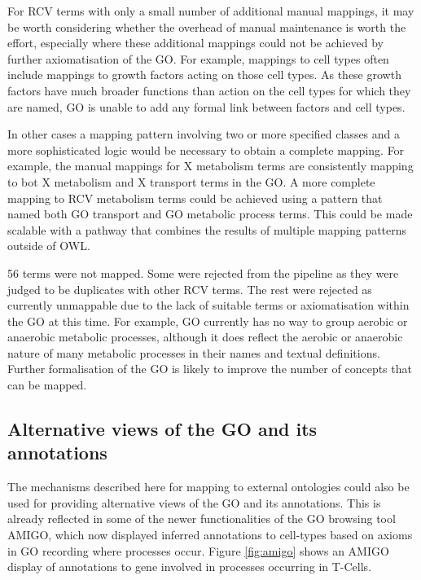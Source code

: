 \documentclass[runningheads,a4paper]{llncs}
\begin{document}
{{For RCV terms with only a small number of additional manual mappings, it may be worth considering whether the overhead of manual maintenance is worth the effort, especially where these additional mappings could not be achieved by further axiomatisation of the \ac{GO}.  For example, mappings to cell types often include mappings to growth factors acting on those cell types.  As these growth factors have much broader functions than action on the cell types for which they are named, \ac{GO} is unable to add any formal link between factors and cell types.

In other cases a mapping pattern involving two or more specified classes and a more sophisticated logic would be necessary to obtain a complete mapping.  For example, the manual mappings for X metabolism terms are consistently mapping to bot X metabolism and X transport terms in the \ac{GO}. A more complete mapping to RCV metabolism terms could be achieved using a pattern that named both \ac{GO} transport and \ac{GO} metabolic process terms.  This could be made scalable with a pathway that combines the results of multiple mapping patterns outside of OWL.

56 terms were not mapped.  Some were rejected from the pipeline as they were judged to be duplicates with other RCV terms.  The rest were rejected as currently unmappable due to the lack of suitable terms or axiomatisation within the \ac{GO} at this time.  For example, \ac{GO} currently has no way to group aerobic or anaerobic metabolic processes, although it does reflect the aerobic or anaerobic nature of many metabolic processes in their names and textual definitions. Further formalisation of the \ac{GO} is likely to improve the number of concepts that can be mapped.

\subsection{Alternative views of the \ac{GO} and its annotations}

The mechanisms described here for mapping to external ontologies could also be used for providing alternative views of the \ac{GO} and its annotations.  This is already reflected in some of the newer functionalities of the \ac{GO} browsing tool AMIGO, which now displayed inferred annotations to cell-types based on axioms in \ac{GO} recording where processes occur.  Figure \ref{fig:amigo} shows an AMIGO display of annotations to gene involved in processes occurring in T-Cells.


}}
\end{document}
